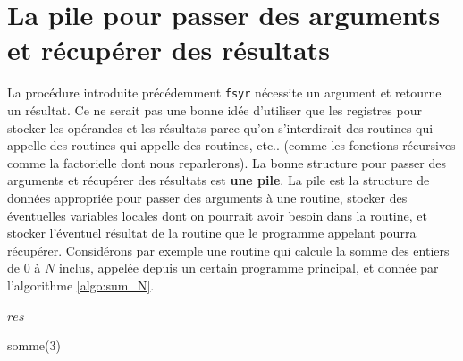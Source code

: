 \section{La pile pour passer des arguments et récupérer des résultats}

La procédure introduite précédemment \texttt{fsyr} nécessite un argument et retourne un résultat. Ce ne serait pas une bonne idée d'utiliser que les registres pour stocker les opérandes et les résultats parce qu'on s'interdirait des routines qui appelle des routines qui appelle des routines, etc.. (comme les fonctions récursives comme la factorielle dont nous reparlerons). La bonne structure pour passer des arguments et récupérer des résultats est \textbf{une pile}. La pile est la structure de données appropriée pour passer des arguments à une routine, stocker des éventuelles variables locales dont on pourrait avoir besoin dans la routine, et stocker l'éventuel résultat de la routine que le programme appelant pourra récupérer. Considérons par exemple une routine qui calcule la somme des entiers de $0$ à $N$ inclus, appelée depuis un certain programme principal, et donnée par l'algorithme \ref{algo:sum_N}.

\begin{algorithm}
\caption{ \label{algo:sum_N}}
\begin{algorithmic}[1]
\EndFor
\State \Return $res$
\EndFunction

\State somme($3$)
\EndFunction
\end{algorithmic}
\end{algorithm}


